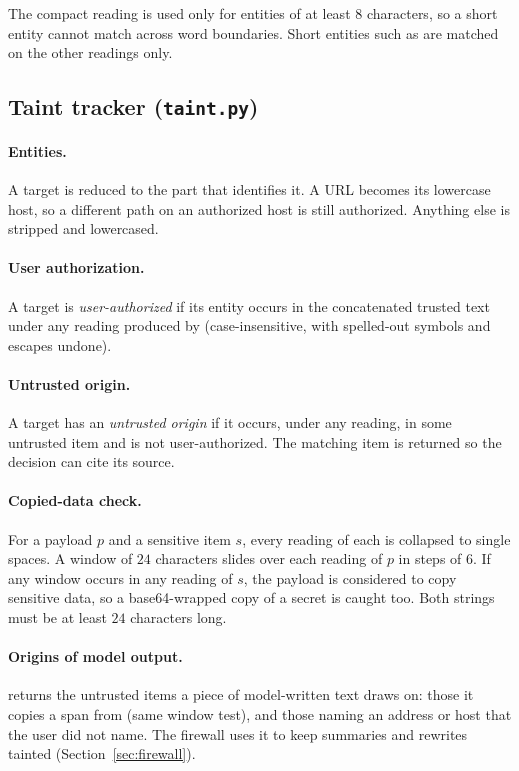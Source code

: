\documentclass[11pt,a4paper]{article}
\newcommand{\code}[1]{\texttt{\detokenize{#1}}}
\begin{document}
The compact reading is used only for entities of at least $8$ characters, so a short entity cannot match across word boundaries. Short entities such as \code{a.b} are matched on the other readings only.

\subsection{Taint tracker (\texttt{taint.py})}
\paragraph{Entities.} A target is reduced to the part that identifies it. A URL becomes its lowercase host, so a different path on an authorized host is still authorized. Anything else is stripped and lowercased.

\paragraph{User authorization.} A target is \emph{user-authorized} if its entity occurs in the concatenated trusted text under any reading produced by \code{normalize.py} (case-insensitive, with spelled-out symbols and escapes undone).

\paragraph{Untrusted origin.} A target has an \emph{untrusted origin} if it occurs, under any reading, in some untrusted item and is not user-authorized. The matching item is returned so the decision can cite its source.

\paragraph{Copied-data check.} For a payload $p$ and a sensitive item $s$, every reading of each is collapsed to single spaces. A window of $24$ characters slides over each reading of $p$ in steps of $6$. If any window occurs in any reading of $s$, the payload is considered to copy sensitive data, so a base64-wrapped copy of a secret is caught too. Both strings must be at least $24$ characters long.

\paragraph{Origins of model output.} \code{origins_of(text)} returns the untrusted items a piece of model-written text draws on: those it copies a span from (same window test), and those naming an address or host that the user did not name. The firewall uses it to keep summaries and rewrites tainted (Section~\ref{sec:firewall}).
\end{document}
